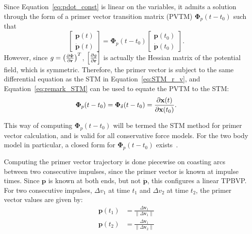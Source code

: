 Since Equation~\eqref{eq:pdot_const} is linear on the variables, it admits a solution through the form of a primer vector transition matrix (PVTM) \(\mathbf{\Phi}_p(t - t_0)\) such that
\begin{equation}
    \begin{bmatrix}
        \mathbf{p}(t) \\ \dot{\mathbf{p}}(t)
    \end{bmatrix} = \mathbf{\Phi}_p(t - t_0) \begin{bmatrix}
        \mathbf{p}(t_0) \\ \dot{\mathbf{p}}(t_0)
    \end{bmatrix}.
\end{equation}
However, since \(g = \left(\frac{\partial \Phi}{\partial \mathbf{r}}\right)^T\), \(\left[\frac{\partial g}{\partial \mathbf{r}}\right]\) is actually the Hessian matrix of the potential field, which is symmetric. Therefore, the primer vector is subject to the same differential equation as the STM in Equation~\eqref{eq:STM_r_v}, and Equation~\eqref{eq:remark_STM} can be used to equate the PVTM to the STM:
\begin{equation}
    \mathbf{\Phi}_p(t - t_0) = \mathbf{\Phi}_\delta(t - t_0) = \frac{\partial \mathbf{x}(t)}{\partial \mathbf{x}(t_0)}.
\end{equation}

This way of computing \(\mathbf{\Phi}_p(t - t_0)\) will be termed the STM method for primer vector calculation, and is valid for all conservative force models. For the two body model in particular, a closed form for \(\mathbf{\Phi}_p(t-t_0)\) exists~\cite{glandorf_transition_matrix}. 

Computing the primer vector trajectory is done piecewise on coasting arcs between two consecutive impulses, since the primer vector is known at impulse times. Since \(\mathbf{p}\) is known at both ends, but not \(\dot{\mathbf{p}}\), this configures a linear TPBVP\@. For two consecutive impulses, \(\Delta v_1\) at time \(t_1\) and \(\Delta v_2\) at time \(t_2\), the primer vector values are given by:
\begin{align}\label{eq:pv_deltav}
    \mathbf{p}(t_1) &= \frac{\Delta \mathbf{v}_1}{\lVert \Delta \mathbf{v}_1 \rVert} \\
    \mathbf{p}(t_2) &= \frac{\Delta \mathbf{v}_1}{\lVert \Delta \mathbf{v}_2 \rVert}
\end{align}

